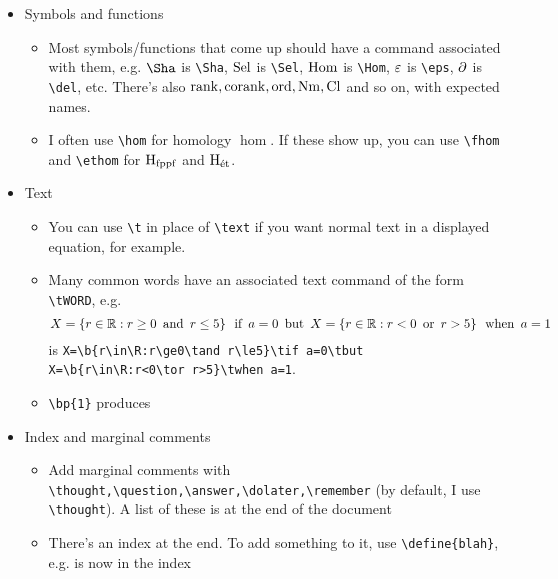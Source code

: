 \documentclass{article}
\numberwithin{thm}{section}
\numberwithin{prob}{section}
\numberwithin{equation}{section}
\begin{document}
\begin{itemize}
\begin{itemize}
        \item Many common diagram shapes have commands associated with them (with the arguments generally ordered top to bottom, left to right), see e.g. the code producing these
        $$\commsquare AfBghCiD\tand\barecommsquare ABCD\tand\mapover XfYpqS$$
        $$\compdiag AfBgC{g\circ f}\tand\mapwithsect E\pi X\sigma\tand\correspondence ZpqXY\tand\mapdown Xf{\t{flat}}Y$$
        \item There's even a command for homomorphisms between short exact sequences. The below diagram was produced using \verb+\homses{A}{f}{B}{g}{C}{\alpha}{\beta}{\gamma}{A'}{f'}{B'}{g'}{C'}+
        $$\homses AfBgC\alpha\beta\gamma{A'}{f'}{B'}{g'}{C'}$$
    \end{itemize}
    \item Symbols and functions
    \begin{itemize}
        \item Most symbols/functions that come up should have a command associated with them, e.g. $\Sha$ is \verb+\Sha+, $\operatorname{Sel}$ is \verb+\Sel+, $\operatorname{Hom}$ is \verb+\Hom+, $\varepsilon$ is \verb+\eps+, $\partial$ is \verb+\del+, etc. There's also $\operatorname{rank},\operatorname{corank},\operatorname{ord},\operatorname{Nm},\operatorname{Cl}$ and so on, with expected names.
        \item I often use \verb+\hom+ for homology $\hom$. If these show up, you can use \verb+\fhom+ and \verb+\ethom+ for $\operatorname H_{\mathrm{fppf}}$ and $\operatorname H_{\text{\'et}}$.
    \end{itemize}
    \item Text
    \begin{itemize}
        \item You can use \verb+\t+ in place of \verb+\text+ if you want normal text in a displayed equation, for example.
        \item Many common words have an associated text command of the form \verb+\tWORD+, e.g.
        $$X=\left\{r\in\mathbb R:r\ge0\,\text{ and }\, r\le5\right\}\,\text{ if }\, a=0\,\text{ but }\, X=\left\{r\in\mathbb R:r<0\,\text{ or }\, r>5\right\}\,\text{ when }\, a=1$$
        is \verb|X=\b{r\in\R:r\ge0\tand r\le5}\tif a=0\tbut X=\b{r\in\R:r<0\tor r>5}\twhen a=1|.
        \item \verb+\bp{1}+ produces 
    \end{itemize}
    \item Index and marginal comments
    \begin{itemize}
        \item Add marginal comments with \verb+\thought,\question,\answer,\dolater,\remember+ (by default, I use \verb+\thought+). A list of these is at the end of the document
        \item There's an index at the end. To add something to it, use \verb+\define{blah}+, e.g.  is now in the index

\end{itemize}
\end{itemize}
\end{document}
